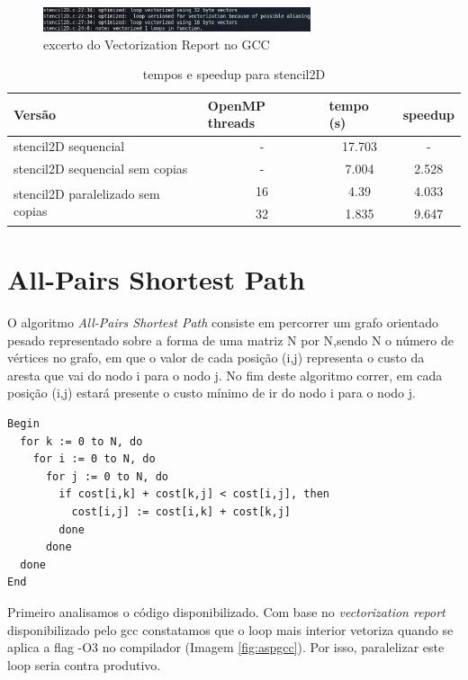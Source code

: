 \documentclass[a4paper]{report}
\begin{document}
\begin{figure}[h]
    \centering
        \includegraphics[width=0.7\textwidth]{images/stencil2D_gcc.png}
        \caption{excerto do Vectorization Report no GCC}
        \label{fig:stencil2dgcc}
\end{figure}

\begin{table}[h]
\centering
\begin{tabular}{|l|c|c|c|}
\hline
Versão & \multicolumn{1}{l|}{OpenMP threads} & \multicolumn{1}{l|}{tempo (s)} & \multicolumn{1}{l|}{speedup} \\ \hline
stencil2D sequencial & -  & 17.703 & - \\ \hline
stencil2D sequencial sem copias & -  & 7.004  & 2.528 \\ \hline
\multirow{2}{*}{stencil2D paralelizado sem copias} & 16 & 4.39 & 4.033 \\ \cline{2-4}
                     & 32 & 1.835  & 9.647 \\ \hline
\end{tabular}
\caption{tempos e speedup para stencil2D}
\label{tab:stencil2Dtimes}
\end{table}

\chapter{All-Pairs Shortest Path}

O algoritmo \textit{All-Pairs Shortest Path} consiste em percorrer um grafo
orientado pesado representado sobre a forma de uma matriz N por N,sendo N o
número de vértices no grafo, em que o valor de cada
posição (i,j) representa o custo da aresta que vai do nodo i para o nodo j. No fim deste
algoritmo correr, em cada posição (i,j) estará presente o custo mínimo de ir do
nodo i para o nodo j.

\begin{verbatim}
Begin
  for k := 0 to N, do
    for i := 0 to N, do
      for j := 0 to N, do
        if cost[i,k] + cost[k,j] < cost[i,j], then
          cost[i,j] := cost[i,k] + cost[k,j]
        done
      done
  done
End
\end{verbatim}

Primeiro analisamos o código disponibilizado. Com base no \textit{vectorization
report} disponibilizado pelo gcc constatamos que o loop mais interior vetoriza
quando se aplica a flag -O3 no compilador (Imagem \ref{fig:aspgcc}).
Por isso, paralelizar este loop seria contra produtivo.
\end{document}
